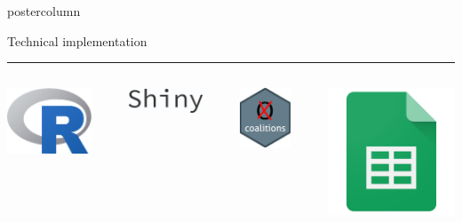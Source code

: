 \documentclass[final,hyperref={pdfpagelabels=false}]{beamer}
\newcommand*\circled[1]{\tikz[baseline=(char.base)]{
\node[shape=circle,draw,inner sep=2pt] (char) {#1};}}
\begin{document}
\begin{frame}
\begin{columns}
\begin{column}{1\textwidth}
\begin{columns}[T]
\begin{column}{.484\textwidth}
\begin{beamercolorbox}[center,wd=\textwidth]{postercolumn}
\begin{minipage}[T]{.95\textwidth}
\begin{block}{\footnotesize \circled{3} Technical implementation}
\vspace{1ex}
\textcolor{LMUlightgray}{\hrule{}}
\vspace{1ex}
\begin{columns}[t]
  \begin{column}{.15\textwidth}
  \begin{center}
  \includegraphics[height=5ex]{figures/implementation_r}
  \end{center}
  \end{column}

  \hspace{-1.5ex}
  \textcolor{LMUlightgray}{\vrule{}}
  \hspace{1.5ex}

  \begin{column}{.15\textwidth}
  \begin{center}
  \vspace{1ex}
  \includegraphics[height=3ex]{figures/implementation_shiny}
  \end{center}
  \end{column}

  \hspace{-1.5ex}
  \textcolor{LMUlightgray}{\vrule{}}
  \hspace{1.5ex}

  \begin{column}{.15\textwidth}
  \begin{center}
  \includegraphics[height=5ex]{figures/implementation_coalitions}
  \end{center}
  \end{column}

  \hspace{-1.5ex}
  \textcolor{LMUlightgray}{\vrule{}}
  \hspace{1.5ex}

  \begin{column}{.15\textwidth}
  \begin{center}
  \includegraphics[height=5ex]{figures/implementation_sheets}
  \end{center}
  \end{column}


\end{columns}
\end{block}
\end{minipage}
\end{beamercolorbox}
\end{column}
\end{columns}
\end{column}
\end{columns}
\end{frame}
\end{document}
